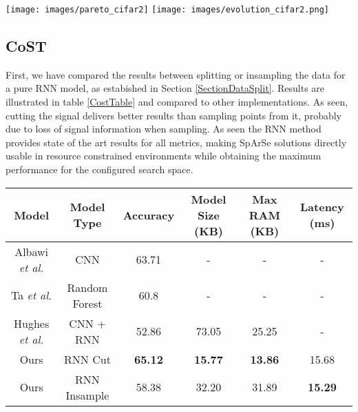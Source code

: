 \documentclass[10pt, a4paper, twocolumn]{article}
\begin{document}
\begin{figure*}[bp]
	\centering
	\texttt{[image: images/pareto\_cifar2]}
	\texttt{[image: images/evolution\_cifar2.png]}
	\caption{Left: Pareto frontier for our implementation of Sparse and Cifar 10 Binary. Notice the different possibilities to choose among regarding RAM, size and performance. Each point corresponds to a specific configuration of the search space. Right: full search procedure for CIFAR-10 Binary with the modified SpArSe. The color degradation shows the progress of the search.}
	\label{fig:paretocifar2}
\end{figure*}



\subsection{CoST}
First, we have compared the results between splitting or insampling the data for a pure RNN model, as estabished in Section \ref{SectionDataSplit}. Results are illustrated in table \ref{CostTable} and compared to other implementations. As seen, cutting the signal delivers better results than sampling points from it, probably due to loss of signal information when sampling. As seen the RNN method provides state of the art results for all metrics, making SpArSe solutions directly usable in resource constrained environments while obtaining the maximum performance for the configured search space. 

\begin{table*}
\center
\begin{tabular}{|c|c|c|c|c|c|}
	\hline
	Model	& Model Type & Accuracy & Model Size (KB) & Max RAM (KB) & Latency (ms) \\
	\hline
	Albawi \textit{et al.} \cite{Albawi2018}  & CNN & 63.71  & -  & -  & - \\
	\hline
	Ta \textit{et al.} \cite{Ta2015a} & Random Forest & 60.8  & -  & - & -  \\
	\hline
	Hughes \textit{et al.} \cite{Hughes2017} & CNN + RNN & 52.86 &  73.05 & 25.25 & -  \\
	\hline
	Ours & RNN Cut & \textbf{65.12} & \textbf{15.77} & \textbf{13.86} & 15.68 \\
	\hline
	Ours & RNN Insample & 58.38 & 32.20 & 31.89 & \textbf{15.29} \\
	\hline
\end{tabular}
\caption{Results for the CoST dataset with hold one subject out cross validation, as in \cite{Albawi2018} and \cite{Jung2015}.}\label{CostTable}
\end{table*}
\end{document}
